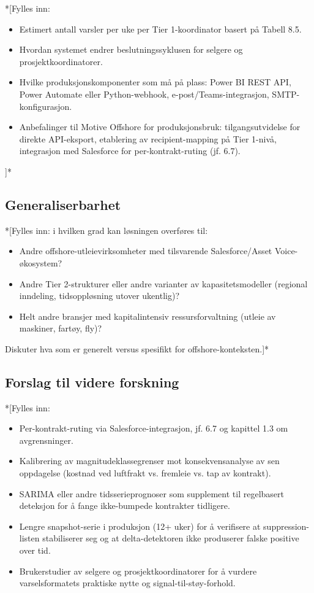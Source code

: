 \documentclass[a4paper,11pt]{article}
\begin{document}
*[Fylles inn:

\begin{itemize}
\item Estimert antall varsler per uke per Tier 1-koordinator basert på Tabell 8.5.
\item Hvordan systemet endrer beslutningssyklusen for selgere og prosjektkoordinatorer.
\item Hvilke produksjonskomponenter som må på plass: Power BI REST API, Power Automate eller Python-webhook, e-post/Teams-integrasjon, SMTP-konfigurasjon.
\item Anbefalinger til Motive Offshore for produksjonsbruk: tilgangsutvidelse for direkte API-eksport, etablering av recipient-mapping på Tier 1-nivå, integrasjon med Salesforce for per-kontrakt-ruting (jf. 6.7).
\end{itemize}

]*

\subsection{Generaliserbarhet}

*[Fylles inn: i hvilken grad kan løsningen overføres til:

\begin{itemize}
\item Andre offshore-utleievirksomheter med tilsvarende Salesforce/Asset Voice-økosystem?
\item Andre Tier 2-strukturer eller andre varianter av kapasitetsmodeller (regional inndeling, tidsoppløsning utover ukentlig)?
\item Helt andre bransjer med kapitalintensiv ressursforvaltning (utleie av maskiner, fartøy, fly)?
\end{itemize}

Diskuter hva som er generelt versus spesifikt for offshore-konteksten.]*

\subsection{Forslag til videre forskning}

*[Fylles inn:

\begin{itemize}
\item Per-kontrakt-ruting via Salesforce-integrasjon, jf. 6.7 og kapittel 1.3 om avgrensninger.
\item Kalibrering av magnitudeklassegrenser mot konsekvensanalyse av sen oppdagelse (kostnad ved luftfrakt vs. fremleie vs. tap av kontrakt).
\item SARIMA eller andre tidsserieprognoser som supplement til regelbasert deteksjon for å fange ikke-bumpede kontrakter tidligere.
\item Lengre snapshot-serie i produksjon (12+ uker) for å verifisere at suppression-listen stabiliserer seg og at delta-detektoren ikke produserer falske positive over tid.
\item Brukerstudier av selgere og prosjektkoordinatorer for å vurdere varselsformatets praktiske nytte og signal-til-støy-forhold.
\end{itemize}
\end{document}
